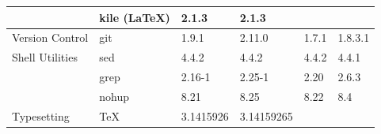 \begin{table}[!ht]
{\begin{tabular}{ll|l|l|l|l|}
\rowcolor{gray!25}
\cellcolor{white}                                                      & \multicolumn{1}{|l|}{kile (\LaTeX)}          & 2.1.3                                                               & 2.1.3                                                             &                                                                        &                                                \\
\hline
\cellcolor{white} Version Control                                      & \multicolumn{1}{|l|}{git}                    & 1.9.1                                                               & 2.11.0                                                            & 1.7.1                                                                  & 1.8.3.1                                        \\
\hline

\rowcolor{gray!25}
\cellcolor{white} Shell Utilities                                      & \multicolumn{1}{|l|}{sed}                    & 4.4.2                                                               & 4.4.2                                                             & 4.4.2                                                                  & 4.4.1                                          \\
\cline{2-6}
\cellcolor{white}                                                      & \multicolumn{1}{|l|}{grep}                   & 2.16-1                                                              & 2.25-1                                                            & 2.20                                                                   & 2.6.3                                          \\
\cline{2-6}

\rowcolor{gray!25}
\cellcolor{white}                                                      & \multicolumn{1}{|l|}{nohup}                  & 8.21                                                                & 8.25                                                              & 8.22                                                                   & 8.4                                            \\
\hline
\cellcolor{white} Typesetting                                          & \multicolumn{1}{|l|}{\TeX}                   & 3.1415926                                                           & 3.14159265                                                        &                                                                        &                                                \\
\cline{2-6}


\end{tabular}}
\end{table}
